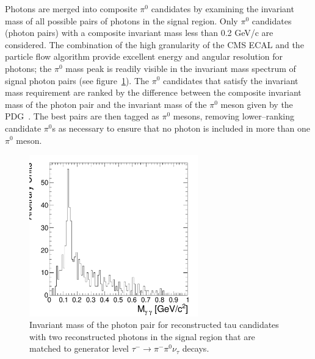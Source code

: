 Photons are merged into composite $\pi^0$ candidates by examining the invariant
mass of all possible pairs of photons in the signal region.  Only $\pi^0$
candidates (photon pairs) with a composite invariant mass less than 0.2 GeV/c
are considered. The combination of the high granularity of the CMS ECAL and the
particle flow algorithm provide excellent energy and angular resolution for
photons; the $\pi^0$ mass peak is readily visible in the invariant mass spectrum
of signal photon pairs (see figure~\ref{fig:imDiPhotonsForTrueDM1}).  The
$\pi^0$ candidates that satisfy the invariant mass requirement are ranked by the
difference between the composite invariant mass of the photon pair and the
invariant mass of the $\pi^0$ meson given by the PDG~\cite{PDG}. The best pairs
are then tagged as $\pi^0$ mesons, removing lower--ranking candidate $\pi^0$s as
necessary to ensure that no photon is included in more than one $\pi^0$ meson.

\begin{figure}[thbp]
  \begin{center}
    \includegraphics*[height=70mm]{tanc_chapter/figures/decayModeMergerAndFilter/invariantMassOfDiPhotonsForDM1.pdf}
    \caption[Invariant mass photon pairs in reconstructed $\pi^0$
    mesons]{Invariant mass of the photon pair for reconstructed
    tau candidates with two reconstructed photons in the signal region
    that are matched to generator level $\tau^{-} \to \pi^{-}\pi^0\nu_\tau$
    decays. }
  \end{center}
  \label{fig:imDiPhotonsForTrueDM1}
\end{figure}

